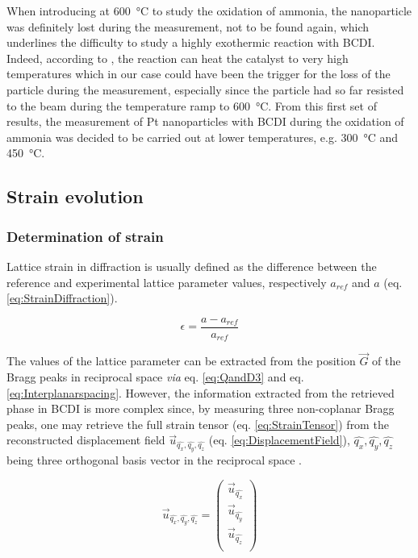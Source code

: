 When introducing \dioxygen at \qty{600}{\degreeCelsius} to study the oxidation of ammonia, the nanoparticle was definitely lost during the measurement, not to be found again, which underlines the difficulty to study a highly exothermic reaction with BCDI.
Indeed, according to \cite{}, the reaction can heat the catalyst to very high temperatures which in our case could have been the trigger for the loss of the particle during the measurement, especially since the particle had so far resisted to the beam during the temperature ramp to \qty{600}{\degreeCelsius}.
From this first set of results, the measurement of Pt nanoparticles with BCDI during the oxidation of ammonia was decided to be carried out at lower temperatures, e.g. \qty{300}{\degreeCelsius} and \qty{450}{\degreeCelsius}.

\subsection{Strain evolution} \label{sec:StrainTempRamp}

\subsubsection{Determination of strain}

Lattice strain in diffraction is usually defined as the difference between the  reference and experimental lattice parameter values, respectively $a_{ref}$ and $a$ (eq. \ref{eq:StrainDiffraction}).

\begin{equation}
    \epsilon = \frac{a - a_{ref}}{a_{ref}}
    \label{eq:StrainDiffraction}
\end{equation}

The values of the lattice parameter can be extracted from the position $\vec{G}$ of the Bragg peaks in reciprocal space \textit{via} eq. \ref{eq:QandD3} and eq. \ref{eq:Interplanarspacing}.
However, the information extracted from the retrieved phase in BCDI is more complex since, by measuring three non-coplanar Bragg peaks, one may retrieve the full strain tensor (eq. \ref{eq:StrainTensor}) from the reconstructed displacement field $\vec{u}_{\hat{q_x}, \hat{q_y}, \hat{q_z}}$ (eq. \ref{eq:DisplacementField}), $\hat{q_x}, \hat{q_y}, \hat{q_z}$ being three orthogonal basis vector in the reciprocal space \parencite{Karpov2019}.

\begin{equation}
    \vec{u}_{\hat{q_x}, \hat{q_y}, \hat{q_z}} =
     \begin{pmatrix}
        \vec{u}_{\hat{q_x}} \\
        \vec{u}_{\hat{q_y}} \\
        \vec{u}_{\hat{q_z}} \\
     \end{pmatrix}
     \label{eq:DisplacementField}
\end{equation}

